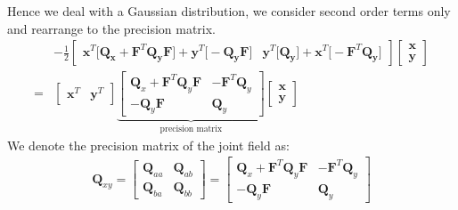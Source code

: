 Hence we deal with a Gaussian distribution, we consider second order terms only and rearrange to the precision matrix.
\begin{align}
    &- \frac{1}{2} \begin{bmatrix}
        \bm{x}^T \big[ \bm{Q_x} + \bm{F}^T \bm{Q_y} \bm{F} \big]  + \bm{y}^T \big[ - \bm{Q_y F} \big] & \bm{y}^T \big[ \bm{Q_y} \big] + \bm{x}^T \big[ - \bm{F}^T \bm{Q_y} \big] 
    \end{bmatrix}  \begin{bmatrix}
        \bm{x} \\ \bm{y}
    \end{bmatrix} \\
    =& \begin{bmatrix}
        \bm{x}^T & \bm{y}^T
    \end{bmatrix} 
    \underbrace{\begin{bmatrix}
        \bm{Q}_x + \bm{F}^T \bm{Q}_y \bm{F} & - \bm{F}^T \bm{Q}_y \\
        -\bm{Q}_y \bm{F} & \bm{Q}_y
    \end{bmatrix}}_\text{precision matrix} \begin{bmatrix}
        \bm{x} \\ \bm{y}
    \end{bmatrix} 
\end{align}
We denote the precision matrix of the joint field as:
\begin{align}
    \bm{Q}_{xy} = \begin{bmatrix}
        \bm{Q}_{aa} & \bm{Q}_{ab} \\
        \bm{Q}_{ba} & \bm{Q}_{bb}
    \end{bmatrix} = 
    \begin{bmatrix}
        \bm{Q}_x + \bm{F}^T \bm{Q}_y \bm{F} & - \bm{F}^T \bm{Q}_y \\
        -\bm{Q}_y \bm{F} & \bm{Q}_y
    \end{bmatrix}
\end{align}


